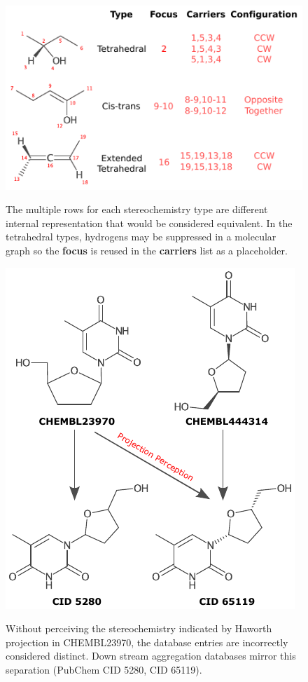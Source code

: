 \documentclass[10pt]{bmcart}
\begin{document}
\begin{backmatter}
\begin{figure}[h!]
  \caption{ 
  The multiple rows for each
  stereochemistry type are different internal representation that
  would be considered equivalent. In the tetrahedral types,
  hydrogens may be suppressed in a molecular graph so the
  \textbf{focus} is reused in the \textbf{carriers} list as a
  placeholder.}
\centering
\includegraphics{img/stereodesc_annotated.pdf}
\label{fig:stereodatastructure}
\end{figure}




\begin{figure}[h!]
  \caption{
    Without perceiving the stereochemistry indicated by Haworth
    projection in CHEMBL23970, the database entries are incorrectly
    considered distinct. Down stream aggregation databases mirror this
    separation (PubChem CID 5280, CID 65119).}
    \centering
    \includegraphics{img/projections_annotated.pdf}
    \label{fig:stereoprojections}
\end{figure}


\end{backmatter}
\end{document}
